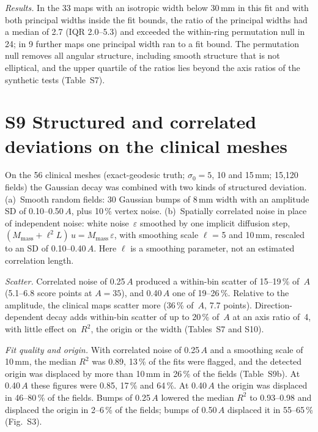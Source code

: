 \documentclass[10pt,a4paper]{article}
\renewcommand{\thetable}{S\arabic{table}}
\newcommand{\stab}[1]{\renewcommand{\thetable}{#1}}
\begin{document}
\noindent\textit{Results.} In the 33 maps with an isotropic width below 30\,mm in this fit and with both principal widths inside the fit bounds, the ratio of the principal widths had a median of 2.7 (IQR 2.0--5.3) and exceeded the within-ring permutation null in 24; in 9 further maps one principal width ran to a fit bound.  The permutation null removes all angular structure, including smooth structure that is not elliptical, and the upper quartile of the ratios lies beyond the axis ratios of the synthetic tests (Table~S7).

\stab{S8}

\section*{S9 Structured and correlated deviations on the clinical meshes}
On the 56 clinical meshes (exact-geodesic truth; $\sigma_0 = 5$, 10 and 15\,mm; 15{,}120 fields) the Gaussian decay was combined with two kinds of structured deviation.  (a)~Smooth random fields: 30 Gaussian bumps of 8\,mm width with an amplitude SD of 0.10--0.50\,$A$, plus 10\,\% vertex noise.  (b)~Spatially correlated noise in place of independent noise: white noise~$\varepsilon$ smoothed by one implicit diffusion step, $(M_{\mathrm{mass}} + \ell^2 L)\,u = M_{\mathrm{mass}}\,\varepsilon$, with smoothing scale $\ell$ = 5 and 10\,mm, rescaled to an SD of 0.10--0.40\,$A$.  Here $\ell$ is a smoothing parameter, not an estimated correlation length.

\textit{Scatter.}  Correlated noise of 0.25\,$A$ produced a within-bin scatter of 15--19\,\% of~$A$ (5.1--6.8 score points at $A = 35$), and 0.40\,$A$ one of 19--26\,\%.  Relative to the amplitude, the clinical maps scatter more (36\,\% of~$A$, 7.7 points).  Direction-dependent decay adds within-bin scatter of up to 20\,\% of~$A$ at an axis ratio of~4, with little effect on~$R^2$, the origin or the width (Tables~S7 and S10).

\textit{Fit quality and origin.}  With correlated noise of 0.25\,$A$ and a smoothing scale of 10\,mm, the median $R^2$ was 0.89, 13\,\% of the fits were flagged, and the detected origin was displaced by more than 10\,mm in 26\,\% of the fields (Table~S9b).  At 0.40\,$A$ these figures were 0.85, 17\,\% and 64\,\%.  At 0.40\,$A$ the origin was displaced in 46--80\,\% of the fields.  Bumps of 0.25\,$A$ lowered the median $R^2$ to 0.93--0.98 and displaced the origin in 2--6\,\% of the fields; bumps of 0.50\,$A$ displaced it in 55--65\,\% (Fig.~S3).
\end{document}
